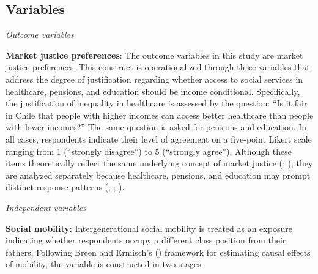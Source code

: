 \documentclass[
  12pt,
]{article}
\begin{document}
\subsection{Variables}\label{variables}

\emph{Outcome variables}

\textbf{Market justice preferences}: The outcome variables in this study
are market justice preferences. This construct is operationalized
through three variables that address the degree of justification
regarding whether access to social services in healthcare, pensions, and
education should be income conditional. Specifically, the justification
of inequality in healthcare is assessed by the question: ``Is it fair in
Chile that people with higher incomes can access better healthcare than
people with lower incomes?'' The same question is asked for pensions and
education. In all cases, respondents indicate their level of agreement
on a five-point Likert scale ranging from 1 (``strongly disagree'') to 5
(``strongly agree''). Although these items theoretically reflect the
same underlying concept of market justice
(;
), they are analyzed
separately because healthcare, pensions, and education may prompt
distinct response patterns
(;
;
).

\emph{Independent variables}

\textbf{Social mobility}: Intergenerational social mobility is treated
as an exposure indicating whether respondents occupy a different class
position from their fathers. Following Breen and Ermisch's
() framework for estimating
causal effects of mobility, the variable is constructed in two stages.
\end{document}
